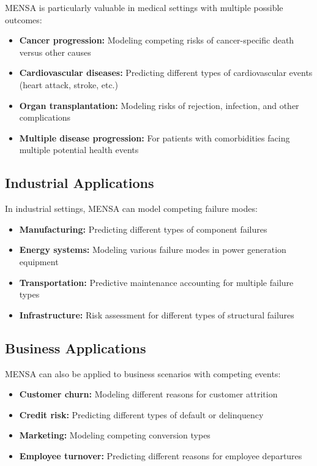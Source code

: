 MENSA is particularly valuable in medical settings with multiple possible outcomes:

\begin{itemize}
    \item \textbf{Cancer progression:} Modeling competing risks of cancer-specific death versus other causes
    \item \textbf{Cardiovascular diseases:} Predicting different types of cardiovascular events (heart attack, stroke, etc.)
    \item \textbf{Organ transplantation:} Modeling risks of rejection, infection, and other complications
    \item \textbf{Multiple disease progression:} For patients with comorbidities facing multiple potential health events
\end{itemize}

\subsection{Industrial Applications}

In industrial settings, MENSA can model competing failure modes:

\begin{itemize}
    \item \textbf{Manufacturing:} Predicting different types of component failures
    \item \textbf{Energy systems:} Modeling various failure modes in power generation equipment
    \item \textbf{Transportation:} Predictive maintenance accounting for multiple failure types
    \item \textbf{Infrastructure:} Risk assessment for different types of structural failures
\end{itemize}

\subsection{Business Applications}

MENSA can also be applied to business scenarios with competing events:

\begin{itemize}
    \item \textbf{Customer churn:} Modeling different reasons for customer attrition
    \item \textbf{Credit risk:} Predicting different types of default or delinquency
    \item \textbf{Marketing:} Modeling competing conversion types
    \item \textbf{Employee turnover:} Predicting different reasons for employee departures
\end{itemize}

